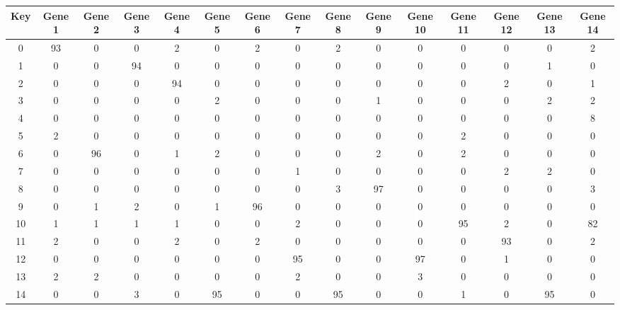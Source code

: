 \begin{tabular}{|c|c|c|c|c|c|c|c|c|c|c|c|c|c|c|}
\hline
Key & Gene 1 & Gene 2 & Gene 3 & Gene 4 & Gene 5 & Gene 6 & Gene 7 & Gene 8 & Gene 9 & Gene 10 & Gene 11 & Gene 12 & Gene 13 & Gene 14 \\
\hline
0 & 93 & 0 & 0 & 2 & 0 & 2 & 0 & 2 & 0 & 0 & 0 & 0 & 0 & 2 \\
1 & 0 & 0 & 94 & 0 & 0 & 0 & 0 & 0 & 0 & 0 & 0 & 0 & 1 & 0 \\
2 & 0 & 0 & 0 & 94 & 0 & 0 & 0 & 0 & 0 & 0 & 0 & 2 & 0 & 1 \\
3 & 0 & 0 & 0 & 0 & 2 & 0 & 0 & 0 & 1 & 0 & 0 & 0 & 2 & 2 \\
4 & 0 & 0 & 0 & 0 & 0 & 0 & 0 & 0 & 0 & 0 & 0 & 0 & 0 & 8 \\
5 & 2 & 0 & 0 & 0 & 0 & 0 & 0 & 0 & 0 & 0 & 2 & 0 & 0 & 0 \\
6 & 0 & 96 & 0 & 1 & 2 & 0 & 0 & 0 & 2 & 0 & 2 & 0 & 0 & 0 \\
7 & 0 & 0 & 0 & 0 & 0 & 0 & 1 & 0 & 0 & 0 & 0 & 2 & 2 & 0 \\
8 & 0 & 0 & 0 & 0 & 0 & 0 & 0 & 3 & 97 & 0 & 0 & 0 & 0 & 3 \\
9 & 0 & 1 & 2 & 0 & 1 & 96 & 0 & 0 & 0 & 0 & 0 & 0 & 0 & 0 \\
10 & 1 & 1 & 1 & 1 & 0 & 0 & 2 & 0 & 0 & 0 & 95 & 2 & 0 & 82 \\
11 & 2 & 0 & 0 & 2 & 0 & 2 & 0 & 0 & 0 & 0 & 0 & 93 & 0 & 2 \\
12 & 0 & 0 & 0 & 0 & 0 & 0 & 95 & 0 & 0 & 97 & 0 & 1 & 0 & 0 \\
13 & 2 & 2 & 0 & 0 & 0 & 0 & 2 & 0 & 0 & 3 & 0 & 0 & 0 & 0 \\
14 & 0 & 0 & 3 & 0 & 95 & 0 & 0 & 95 & 0 & 0 & 1 & 0 & 95 & 0 \\
\hline
\end{tabular}